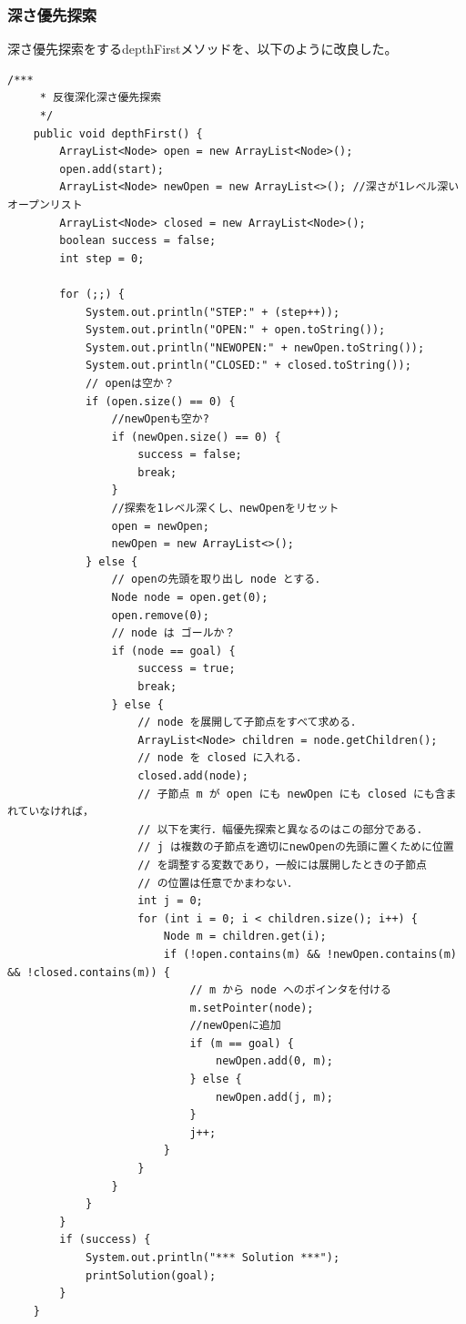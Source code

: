 \documentclass{jarticle}
\begin{document}
\subsubsection{深さ優先探索}
深さ優先探索をするdepthFirstメソッドを、以下のように改良した。
\begin{lstlisting}[caption=depthFirstメソッド(Search4.java),label=src:depthFirst]
    /***
     * 反復深化深さ優先探索
     */
    public void depthFirst() {
        ArrayList<Node> open = new ArrayList<Node>();
        open.add(start);
        ArrayList<Node> newOpen = new ArrayList<>(); //深さが1レベル深いオープンリスト
        ArrayList<Node> closed = new ArrayList<Node>();
        boolean success = false;
        int step = 0;

        for (;;) {
            System.out.println("STEP:" + (step++));
            System.out.println("OPEN:" + open.toString());
            System.out.println("NEWOPEN:" + newOpen.toString());
            System.out.println("CLOSED:" + closed.toString());
            // openは空か？
            if (open.size() == 0) {
                //newOpenも空か?
                if (newOpen.size() == 0) {
                    success = false;
                    break;
                }
                //探索を1レベル深くし、newOpenをリセット
                open = newOpen;
                newOpen = new ArrayList<>();
            } else {
                // openの先頭を取り出し node とする．
                Node node = open.get(0);
                open.remove(0);
                // node は ゴールか？
                if (node == goal) {
                    success = true;
                    break;
                } else {
                    // node を展開して子節点をすべて求める．
                    ArrayList<Node> children = node.getChildren();
                    // node を closed に入れる．
                    closed.add(node);
                    // 子節点 m が open にも newOpen にも closed にも含まれていなければ，
                    // 以下を実行．幅優先探索と異なるのはこの部分である．
                    // j は複数の子節点を適切にnewOpenの先頭に置くために位置
                    // を調整する変数であり，一般には展開したときの子節点
                    // の位置は任意でかまわない．
                    int j = 0;
                    for (int i = 0; i < children.size(); i++) {
                        Node m = children.get(i);
                        if (!open.contains(m) && !newOpen.contains(m) && !closed.contains(m)) {
                            // m から node へのポインタを付ける
                            m.setPointer(node);
                            //newOpenに追加
                            if (m == goal) {
                                newOpen.add(0, m);
                            } else {
                                newOpen.add(j, m);
                            }
                            j++;
                        }
                    }
                }
            }
        }
        if (success) {
            System.out.println("*** Solution ***");
            printSolution(goal);
        }
    }

\end{lstlisting}
\end{document}
